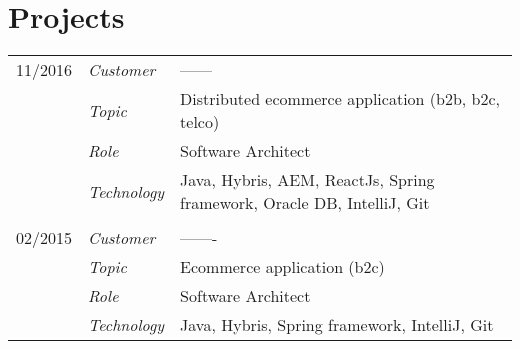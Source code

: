 \section*{Projects}
\renewcommand{\arraystretch}{1.3}
\begin{longtable}{@{}>{}p{4cm}>{\itshape}p{2cm}>{}p{9cm}}
11/2016             & Customer 	    & ------\\
\nopagebreak		& Topic 	    & Distributed ecommerce application (b2b, b2c, telco)\\
\nopagebreak		& Role   	    & Software Architect\\
\nopagebreak		& Technology	& Java, Hybris, AEM, ReactJs, Spring framework, Oracle DB, IntelliJ, Git\\
\\
02/2015             & Customer 	    & -------\\
\nopagebreak		& Topic	        & Ecommerce application (b2c)\\
\nopagebreak		& Role 	        & Software Architect\\
\nopagebreak		& Technology	& Java, Hybris, Spring framework, IntelliJ, Git\\

\end{longtable}
\renewcommand{\arraystretch}{2}


